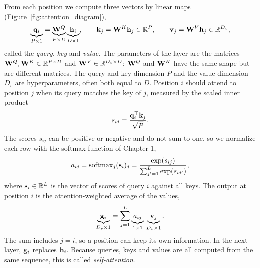 From each position we compute three vectors by linear maps (Figure~\ref{fig:attention_diagram}),
\begin{equation}
  \underbrace{\mathbf{q}_i}_{P\times1} = \underbrace{\mathbf{W}^Q}_{P\times D}\underbrace{\mathbf{h}_i}_{D\times1}, \qquad
  \mathbf{k}_j = \mathbf{W}^K\mathbf{h}_j \in\mathbb{R}^P, \qquad
  \mathbf{v}_j = \mathbf{W}^V\mathbf{h}_j \in\mathbb{R}^{D_v},
\end{equation}
called the \emph{query}, \emph{key} and \emph{value}. The parameters of the layer are the matrices $\mathbf{W}^Q,\mathbf{W}^K\in\mathbb{R}^{P\times D}$ and $\mathbf{W}^V\in\mathbb{R}^{D_v\times D}$; $\mathbf{W}^Q$ and $\mathbf{W}^K$ have the same shape but are different matrices. The query and key dimension $P$ and the value dimension $D_v$ are hyperparameters, often both equal to $D$. Position $i$ should attend to position $j$ when its query matches the key of $j$, measured by the scaled inner product
\begin{equation}
  s_{ij} = \frac{\mathbf{q}_i^\top\mathbf{k}_j}{\sqrt{P}} .
\end{equation}
The scores $s_{ij}$ can be positive or negative and do not sum to one, so we normalize each row with the softmax function of Chapter 1,
\begin{equation}
  a_{ij} = \operatorname{softmax}_j(\mathbf{s}_{i})_j = \frac{\exp(s_{ij})}{\sum_{j'=1}^L\exp(s_{ij'})},
  \label{eq:attn_softmax}
\end{equation}
where $\mathbf{s}_i\in\mathbb{R}^L$ is the vector of scores of query $i$ against all keys. The output at position $i$ is the attention-weighted average of the values,
\begin{equation}
  \underbrace{\mathbf{g}_i}_{D_v\times1} = \sum_{j=1}^{L} \underbrace{a_{ij}}_{1\times1}\,\underbrace{\mathbf{v}_j}_{D_v\times1} .
  \label{eq:attn_output}
\end{equation}
The sum includes $j=i$, so a position can keep its own information. In the next layer, $\mathbf{g}_i$ replaces $\mathbf{h}_i$. Because queries, keys and values are all computed from the same sequence, this is called \emph{self-attention}.

